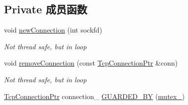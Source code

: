 \subsection*{Private 成员函数}
\begin{DoxyCompactItemize}
\item 
void \hyperlink{classmuduo_1_1net_1_1TcpClient_ae2e5d102f7a519e65019cd5f09acea72}{new\+Connection} (int sockfd)
\begin{DoxyCompactList}\small\item\em Not thread safe, but in loop \end{DoxyCompactList}\item 
void \hyperlink{classmuduo_1_1net_1_1TcpClient_ad9661c3f05443256c9439f812d1a7691}{remove\+Connection} (const \hyperlink{namespacemuduo_1_1net_ab91a46e9290926aa692450e46cfc9039}{Tcp\+Connection\+Ptr} \&conn)
\begin{DoxyCompactList}\small\item\em Not thread safe, but in loop \end{DoxyCompactList}\item 
\hyperlink{namespacemuduo_1_1net_ab91a46e9290926aa692450e46cfc9039}{Tcp\+Connection\+Ptr} connection\+\_\+ \hyperlink{classmuduo_1_1net_1_1TcpClient_a03cf5be0cbac986f5d0f527a62a22033}{G\+U\+A\+R\+D\+E\+D\+\_\+\+BY} (\hyperlink{classmuduo_1_1net_1_1TcpClient_a6e1bf1809a42f40f1a21178dc6620a6f}{mutex\+\_\+})
\end{DoxyCompactItemize}
